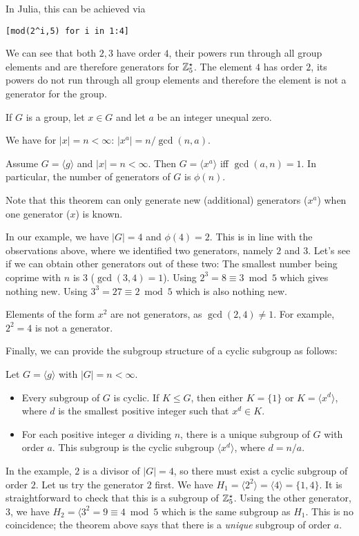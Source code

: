 In Julia, this can be achieved via

\begin{verbatim}
[mod(2^i,5) for i in 1:4]
\end{verbatim}

We can see that both $2, 3$ have order $4$, their powers run through all group elements and are therefore generators for $\mathbb{Z}_5^\star$. The element $4$ has order $2$, its powers do not run through all group elements and therefore the element is not a generator for the group.

\begin{theorem}
	If $G$ is a group, let $x \in G$ and let $a$ be an integer unequal zero.

	We have for $|x| = n < \infty$: $|x^a| = n / \gcd(n,a)$.

	Assume $G = \langle g \rangle$ and $|x| = n < \infty$. Then $G = \langle x^a \rangle$ iff $\gcd(a,n) = 1$. In particular, the number of generators of $G$ is $\phi(n)$.

\end{theorem}

Note that this theorem can only generate new (additional) generators ($x^a$) when one generator ($x$) is known.

In our example, we have $|G| = 4$ and $\phi(4) = 2$. This is in line with the observations above, where we identified two generators, namely $2$ and $3$. Let's see if we can obtain other generators out of these two: The smallest number being coprime with $n$ is $3$ ($\gcd(3,4) = 1$). Using $2^3 = 8 \equiv 3 \bmod 5$ which gives nothing new. Using $3^3 = 27 \equiv 2 \bmod 5$ which is also nothing new.

Elements of the form $x^2$ are not generators, as $\gcd(2,4) \neq 1$. For example, $2^2 = 4$ is not a generator.

Finally, we can provide the subgroup structure of a cyclic subgroup as follows:

\begin{theorem}
	Let $G = \langle g \rangle$ with $|G| = n < \infty$.
	\begin{itemize}
		\item Every subgroup of $G$ is cyclic. If $K \leq G$, then either $K = \{1\}$ or $K = \langle x^d \rangle$, where $d$ is the smallest positive integer such that $x^d \in K$.
		\item For each positive integer $a$ dividing $n$, there is a unique subgroup of $G$ with order $a$. This subgroup is the cyclic subgroup $\langle x^d \rangle$, where $d = n / a$.
	\end{itemize}
\end{theorem}

In the example, $2$ is a divisor of $|G| = 4$, so there must exist a cyclic subgroup of order $2$. Let us try the generator $2$ first. We have $H_1 = \langle 2^2 \rangle =  \langle 4 \rangle = \{1,4\}$. It is straightforward to check that this is a subgroup of $\mathbb{Z}_5^\star$. Using the other generator, $3$, we have $H_2 = \langle 3^2 = 9 \equiv 4 \bmod 5$ which is the same subgroup as $H_1$. This is no coincidence; the theorem above says that there is a \emph{unique} subgroup of order $a$.
